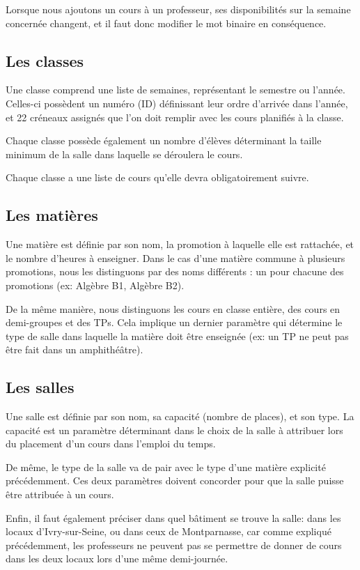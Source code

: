 \documentclass[12pt,a4paper,french]{article}
\begin{document}
Lorsque nous ajoutons un cours à un professeur, ses disponibilités sur la semaine concernée changent, et il faut donc modifier le mot binaire en conséquence.


\subsection{Les classes}
Une classe comprend une liste de semaines, représentant le semestre ou l'année. Celles-ci possèdent un numéro (ID) définissant leur ordre d'arrivée dans l'année, et 22 créneaux assignés que l'on doit remplir avec les cours planifiés à la classe.

Chaque classe possède également un nombre d'élèves déterminant la taille minimum de la salle dans laquelle se déroulera le cours.

Chaque classe a une liste de cours qu'elle devra obligatoirement suivre.

\subsection{Les matières}
Une matière est définie par son nom, la promotion à laquelle elle est rattachée, et le nombre d'heures à enseigner. Dans le cas d'une matière commune à plusieurs promotions, nous les distinguons par des noms différents : un pour chacune des promotions (ex: Algèbre B1, Algèbre B2).

De la même manière, nous distinguons les cours en classe entière, des cours en demi-groupes et des TPs.
Cela implique un dernier paramètre qui détermine le type de salle dans laquelle la matière doit être enseignée (ex: un TP ne peut pas être fait dans un amphithéâtre).

\subsection{Les salles}
Une salle est définie par son nom, sa capacité (nombre de places), et son type.
La capacité est un paramètre déterminant dans le choix de la salle à attribuer lors du placement d'un cours dans l'emploi du temps.

De même, le type de la salle va de pair avec le type d'une matière explicité précédemment. Ces deux paramètres doivent concorder pour que la salle puisse être attribuée à un cours.

Enfin, il faut également préciser dans quel bâtiment se trouve la salle: dans les locaux d'Ivry-sur-Seine, ou dans ceux de Montparnasse, car comme expliqué précédemment, les professeurs ne peuvent pas se permettre de donner de cours dans les deux locaux lors d'une même demi-journée.
\end{document}
